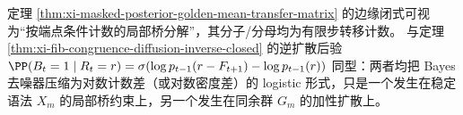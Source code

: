\begin{remark}\label{rem:xi-masked-posterior-logistic-parallel}
定理 \ref{thm:xi-masked-posterior-golden-mean-transfer-matrix} 的边缘闭式可视为“按端点条件计数的局部桥分解”，其分子/分母均为有限步转移计数。
与定理 \ref{thm:xi-fib-congruence-diffusion-inverse-closed} 的逆扩散后验
\(\PP(B_t=1\mid R_t=r)=\sigma(\log p_{t-1}(r-F_{t+1})-\log p_{t-1}(r))\)
同型：两者均把 Bayes 去噪器压缩为对数计数差（或对数密度差）的 logistic 形式，只是一个发生在稳定语法 \(X_m\) 的局部桥约束上，另一个发生在同余群 \(G_m\) 的加性扩散上。
\end{remark}

\endinput
